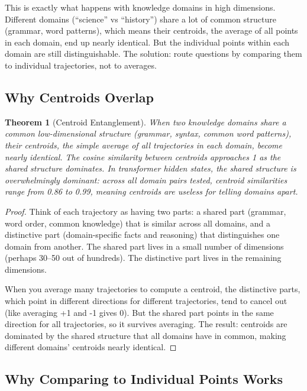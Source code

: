 \documentclass[11pt]{article}
\newtheorem{theorem}{Theorem}[section]
\begin{document}
This is exactly what happens with knowledge domains in high dimensions.
Different domains (``science'' vs ``history'') share a lot of common structure
(grammar, word patterns), which means their centroids, the average
of all points in each domain, end up nearly identical. But the individual
points within each domain are still distinguishable. The solution: route
questions by comparing them to individual trajectories, not to averages.

\subsection{Why Centroids Overlap}

\begin{theorem}[Centroid Entanglement]\label{thm:centroid_entanglement}
When two knowledge domains share a common low-dimensional structure (grammar,
syntax, common word patterns), their centroids, the simple average of all
trajectories in each domain, become nearly identical. The cosine similarity
between centroids approaches 1 as the shared structure dominates. In
transformer hidden states, the shared structure is overwhelmingly dominant:
across all domain pairs tested, centroid similarities range from 0.86 to
0.99, meaning centroids are useless for telling domains apart.
\end{theorem}
\begin{proof}
Think of each trajectory as having two parts: a shared part (grammar,
word order, common knowledge) that is similar across all domains, and a
distinctive part (domain-specific facts and reasoning) that
distinguishes one domain from another. The shared part lives in a small
number of dimensions (perhaps 30--50 out of hundreds). The distinctive part
lives in the remaining dimensions.

When you average many trajectories to compute a centroid, the distinctive
parts, which point in different directions for different trajectories, tend
to cancel out (like averaging +1 and -1 gives 0). But the shared part points
in the same direction for all trajectories, so it survives averaging. The
result: centroids are dominated by the shared structure that all domains
have in common, making different domains' centroids nearly identical.
\end{proof}

\subsection{Why Comparing to Individual Points Works}
\end{document}
